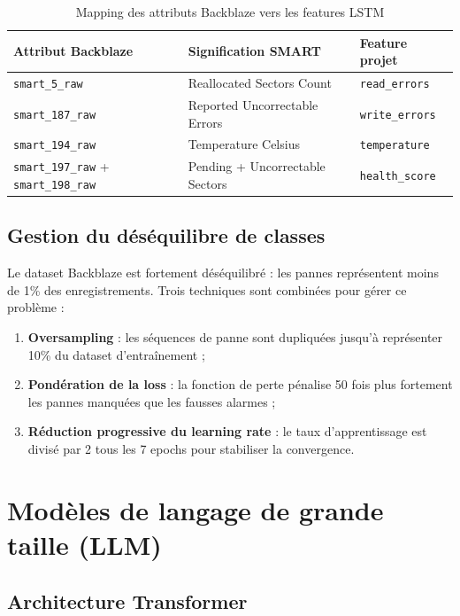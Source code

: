 \begin{table}[H]
\centering
\caption{Mapping des attributs Backblaze vers les features LSTM}
\begin{tabular}{|l|l|l|}
\hline
\rowcolor{lightblue}
\textbf{Attribut Backblaze} & \textbf{Signification SMART} & \textbf{Feature projet} \\
\hline
\texttt{smart\_5\_raw} & Reallocated Sectors Count & \texttt{read\_errors} \\
\hline
\texttt{smart\_187\_raw} & Reported Uncorrectable Errors & \texttt{write\_errors} \\
\hline
\texttt{smart\_194\_raw} & Temperature Celsius & \texttt{temperature} \\
\hline
\texttt{smart\_197\_raw} + \texttt{smart\_198\_raw} & Pending + Uncorrectable Sectors & \texttt{health\_score} \\
\hline
\end{tabular}
\end{table}

\subsection{Gestion du déséquilibre de classes}

Le dataset Backblaze est fortement déséquilibré : les pannes représentent moins
de 1\% des enregistrements. Trois techniques sont combinées pour gérer ce problème :

\begin{enumerate}
  \item \textbf{Oversampling} : les séquences de panne sont dupliquées jusqu'à
        représenter 10\% du dataset d'entraînement ;
  \item \textbf{Pondération de la loss} : la fonction de perte pénalise 50 fois
        plus fortement les pannes manquées que les fausses alarmes ;
  \item \textbf{Réduction progressive du learning rate} : le taux d'apprentissage
        est divisé par 2 tous les 7 epochs pour stabiliser la convergence.
\end{enumerate}

\section{Modèles de langage de grande taille (LLM)}

\subsection{Architecture Transformer}

